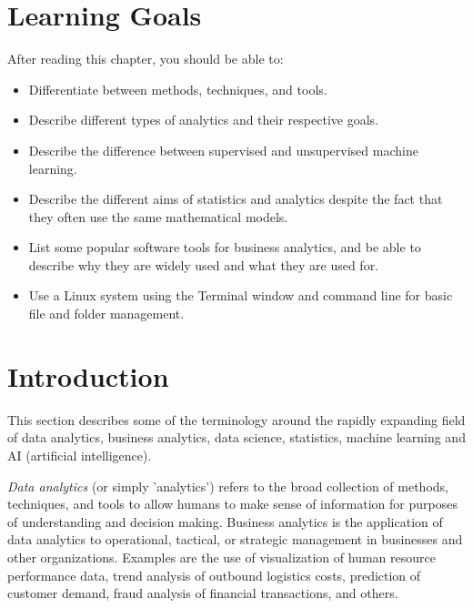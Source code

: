 %
%


\section*{Learning Goals}

After reading this chapter, you should be able to:

\begin{itemize}
   \item Differentiate between methods, techniques, and tools.
   \item Describe different types of analytics and their respective goals.
   \item Describe the difference between supervised and unsupervised machine learning.
   \item Describe the different aims of statistics and analytics despite the fact that they often use the same mathematical models.
   \item List some popular software tools for business analytics, and be able to describe why they are widely used and what they are used for.
   \item Use a Linux system using the Terminal window and command line for basic file and folder management.
\end{itemize}

\section{Introduction}

This section describes some of the terminology around the rapidly expanding field of data analytics, business analytics, data science, statistics, machine learning and AI (artificial intelligence). 

\emph{Data analytics} (or simply 'analytics') refers to the broad collection of methods, techniques, and tools to allow humans to make sense of information for purposes of understanding and decision making. Business analytics is the application of data analytics to operational, tactical, or strategic management in businesses and other organizations. Examples are the use of visualization of human resource performance data, trend analysis of outbound logistics costs, prediction of customer demand, fraud analysis of financial transactions, and others.

